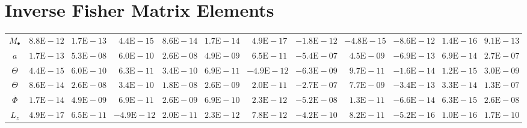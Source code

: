 \appendix

\renewcommand{\chaptername}{Appendix}

\chapter{Inverse Fisher Matrix Elements}

\begin{sidewaystable}[htbp]\footnotesize
\centering
\begin{tabular}{cD{.}{.}{2.5}D{.}{.}{2.5}D{.}{.}{2.5}D{.}{.}{2.5}D{.}{.}{2.5}D{.}{.}{2.5}D{.}{.}{2.5}D{.}{.}{2.5}D{.}{.}{2.5}D{.}{.}{2.5}D{.}{.}{2.5}}
\toprule
 &  &  &  &  &  &  &  &  &  &  &  \\ \midrule
$M_\bullet $ & $8.8\mathrm{E}-12$ & $1.7\mathrm{E}-13$ & $4.4\mathrm{E}-15$ & $8.6\mathrm{E}-14$ & $1.7\mathrm{E}-14$ & $4.9\mathrm{E}-17$ & $-1.8\mathrm{E}-12$ & $-4.8\mathrm{E}-15$ & $-8.6\mathrm{E}-12$ & $1.4\mathrm{E}-16$ & $9.1\mathrm{E}-13$ \\
$a$ & $1.7\mathrm{E}-13$ & $5.3\mathrm{E}-08$ & $6.0\mathrm{E}-10$ & $2.6\mathrm{E}-08$ & $4.9\mathrm{E}-09$ & $6.5\mathrm{E}-11$ & $-5.4\mathrm{E}-07$ & $4.5\mathrm{E}-09$ & $-6.9\mathrm{E}-13$ & $6.9\mathrm{E}-14$ & $2.7\mathrm{E}-07$ \\
$\Theta $ & $4.4\mathrm{E}-15$ & $6.0\mathrm{E}-10$ & $6.3\mathrm{E}-11$ & $3.4\mathrm{E}-10$ & $6.9\mathrm{E}-11$ & $-4.9\mathrm{E}-12$ & $-6.3\mathrm{E}-09$ & $9.7\mathrm{E}-11$ & $-1.6\mathrm{E}-14$ & $1.2\mathrm{E}-15$ & $3.0\mathrm{E}-09$ \\
$\overline{\Theta}$ & $8.6\mathrm{E}-14$ & $2.6\mathrm{E}-08$ & $3.4\mathrm{E}-10$ & $1.8\mathrm{E}-08$ & $2.6\mathrm{E}-09$ & $2.0\mathrm{E}-11$ & $-2.7\mathrm{E}-07$ & $7.7\mathrm{E}-09$ & $-3.4\mathrm{E}-13$ & $3.3\mathrm{E}-14$ & $1.3\mathrm{E}-07$ \\
$\overline{\Phi}$ & $1.7\mathrm{E}-14$ & $4.9\mathrm{E}-09$ & $6.9\mathrm{E}-11$ & $2.6\mathrm{E}-09$ & $6.9\mathrm{E}-10$ & $2.3\mathrm{E}-12$ & $-5.2\mathrm{E}-08$ & $1.3\mathrm{E}-11$ & $-6.6\mathrm{E}-14$ & $6.3\mathrm{E}-15$ & $2.6\mathrm{E}-08$ \\
$L_z $ & $4.9\mathrm{E}-17$ & $6.5\mathrm{E}-11$ & $-4.9\mathrm{E}-12$ & $2.0\mathrm{E}-11$ & $2.3\mathrm{E}-12$ & $7.8\mathrm{E}-12$ & $-4.2\mathrm{E}-10$ & $8.2\mathrm{E}-11$ & $-5.2\mathrm{E}-16$ & $1.0\mathrm{E}-16$ & $1.7\mathrm{E}-10$ \\

\end{tabular}
\end{sidewaystable}
